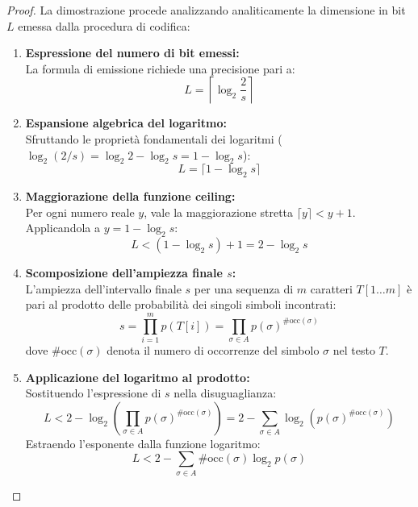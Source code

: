 \begin{proof}
La dimostrazione procede analizzando analiticamente la dimensione in bit $L$ emessa dalla procedura di codifica:

\begin{enumerate}
  \item \textbf{Espressione del numero di bit emessi:}\\
  La formula di emissione richiede una precisione pari a:
  \begin{equation}
    L = \left\lceil \log_2 \frac{2}{s} \right\rceil
  \end{equation}

  \item \textbf{Espansione algebrica del logaritmo:}\\
  Sfruttando le propriet\`a fondamentali dei logaritmi ($\log_2(2/s) = \log_2 2 - \log_2 s = 1 - \log_2 s$):
  \begin{equation}
    L = \lceil 1 - \log_2 s \rceil
  \end{equation}

  \item \textbf{Maggiorazione della funzione ceiling:}\\
  Per ogni numero reale $y$, vale la maggiorazione stretta $\lceil y \rceil < y + 1$. Applicandola a $y = 1 - \log_2 s$:
  \begin{equation}
    L < (1 - \log_2 s) + 1 = 2 - \log_2 s
  \end{equation}

  \item \textbf{Scomposizione dell'ampiezza finale $s$:}\\
  L'ampiezza dell'intervallo finale $s$ per una sequenza di $m$ caratteri $T[1 \dots m]$ \`e pari al prodotto delle probabilit\`a dei singoli simboli incontrati:
  \begin{equation}
    s = \prod_{i=1}^{m} p(T[i]) = \prod_{\sigma \in A} p(\sigma)^{\#\text{occ}(\sigma)}
  \end{equation}
  dove $\#\text{occ}(\sigma)$ denota il numero di occorrenze del simbolo $\sigma$ nel testo $T$.

  \item \textbf{Applicazione del logaritmo al prodotto:}\\
  Sostituendo l'espressione di $s$ nella disuguaglianza:
  \begin{equation}
    L < 2 - \log_2 \left( \prod_{\sigma \in A} p(\sigma)^{\#\text{occ}(\sigma)} \right) = 2 - \sum_{\sigma \in A} \log_2 \left( p(\sigma)^{\#\text{occ}(\sigma)} \right)
  \end{equation}
  Estraendo l'esponente dalla funzione logaritmo:
  \begin{equation}
    L < 2 - \sum_{\sigma \in A} \#\text{occ}(\sigma) \log_2 p(\sigma)
  \end{equation}


\end{enumerate}
\end{proof}
